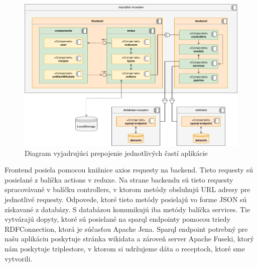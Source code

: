 \begin{figure}[h]
\includegraphics[width=\textwidth]{images/prepojenieComponentDiagram}
\caption{Diagram vyjadrujúci prepojenie jednotlivých častí aplikácie}
\label{prepojenieAplikacie}
\end{figure}

Frontend posiela pomocou knižnice axios requesty na backend. Tieto requesty sú posielané z balíčka actions v reduxe. Na strane backendu sú tieto requesty spracovávané v balíčku controllers, v ktorom metódy obsluhujú URL adresy pre jednotlivé requesty. Odpovede, ktoré tieto metódy posielajú vo forme JSON sú získavané z databázy. S databázou komunikujú iba metódy balíčka services. Tie vytvárajú dopyty, ktoré sú posielané na sparql endpointy pomocou triedy RDFConnection, ktorá je súčasťou Apache Jena. Sparql endpoint potrebný pre našu aplikáciu poskytuje stránka wikidata a zároveň server Apache Fuseki, ktorý nám poskytuje triplestore, v ktorom si udržujeme dáta o receptoch, ktoré sme vytvorili. 
